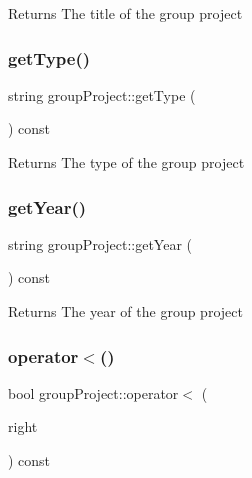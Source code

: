 \begin{DoxyReturn}{Returns}
The title of the group project 
\end{DoxyReturn}
\mbox{\label{classgroup_project_a613e44ba4c31ae2f1969e0873526349b}} 
\subsubsection{\texorpdfstring{get\+Type()}{getType()}}
{\footnotesize\ttfamily string group\+Project\+::get\+Type (\begin{DoxyParamCaption}{ }\end{DoxyParamCaption}) const}

\begin{DoxyReturn}{Returns}
The type of the group project 
\end{DoxyReturn}
\mbox{\label{classgroup_project_aab16c18e6890fce4757001735867f810}} 
\subsubsection{\texorpdfstring{get\+Year()}{getYear()}}
{\footnotesize\ttfamily string group\+Project\+::get\+Year (\begin{DoxyParamCaption}{ }\end{DoxyParamCaption}) const}

\begin{DoxyReturn}{Returns}
The year of the group project 
\end{DoxyReturn}
\mbox{\label{classgroup_project_ac6e0cc6d7f29567b698013fec1d74d19}} 
\subsubsection{\texorpdfstring{operator$<$()}{operator<()}}
{\footnotesize\ttfamily bool group\+Project\+::operator$<$ (\begin{DoxyParamCaption}\item[{const \hyperlink{classgroup_project}{group\+Project} $\ast$}]{right }\end{DoxyParamCaption}) const}



